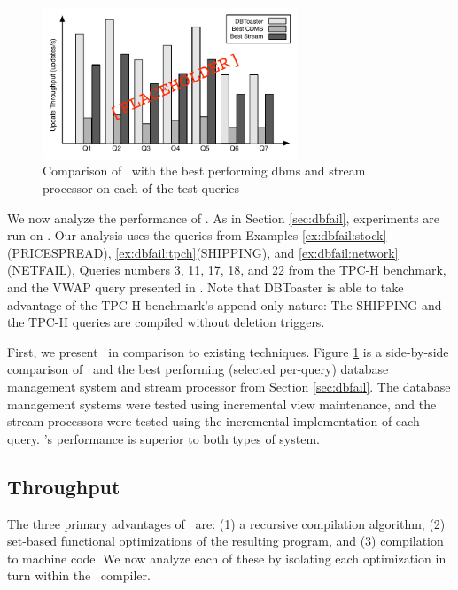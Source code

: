 
\begin{figure}
\begin{center}
\includegraphics[width=3in]{../graphics-tmp/placeholder_bakeoff}
\end{center}
\label{fig:experiments:bakeoff}
\caption{Comparison of \dbtoaster\ with the best performing dbms and stream processor on each of the test queries}
\end{figure}

We now analyze the performance of \dbtoaster.  As in Section \ref{sec:dbfail}, experiments are run on .  Our analysis uses the queries from Examples \ref{ex:dbfail:stock}(PRICESPREAD),  \ref{ex:dbfail:tpch}(SHIPPING), and \ref{ex:dbfail:network}(NETFAIL), Queries numbers 3, 11, 17, 18, and 22 from the TPC-H\cite{tpch} benchmark, and the VWAP query presented in \cite{dbtoaster-cidr}.  Note that DBToaster is able to take advantage of the TPC-H benchmark's append-only nature: The SHIPPING and the TPC-H queries are compiled without deletion triggers.

First, we present \dbtoaster\ in comparison to existing techniques.  Figure \ref{fig:experiments:bakeoff} is a side-by-side comparison of \dbtoaster\ and the best performing (selected per-query) database management system and stream processor from Section \ref{sec:dbfail}.  The database management systems were tested using incremental view maintenance, and the stream processors were tested using the incremental implementation of each query.   \dbtoaster 's performance is superior to both types of system. 

\subsection{Throughput}
The three primary advantages of \dbtoaster\ are: (1) a recursive compilation algorithm, (2) set-based functional optimizations of the resulting program, and (3) compilation to machine code.  We now analyze each of these by isolating each optimization in turn within the \dbtoaster\ compiler.

